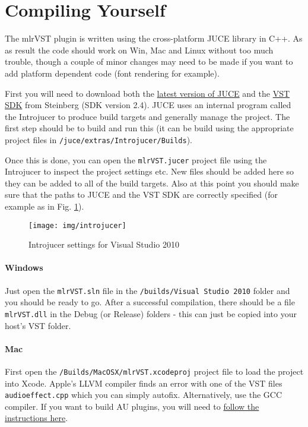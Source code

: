 \documentclass[10pt,a4paper]{report}
\begin{document}
\section{Compiling Yourself}

The mlrVST plugin is written using the cross-platform JUCE library in C++. As as result the code should work on Win, Mac and Linux without too much trouble, though a couple of minor changes may need to be made if you want to add platform dependent code (font rendering for example).

First you will need to download both the \href{https://github.com/julianstorer/JUCE}{latest version of JUCE} and the \href{http://www.steinberg.net/en/company/developer.html}{VST SDK} from Steinberg (SDK version 2.4). JUCE uses an internal program called the Introjucer to produce build targets and generally manage the project. The first step should be to build and run this (it can be build using the appropriate project files in \texttt{/juce/extras/Introjucer/Builds}).

Once this is done, you can open the \texttt{mlrVST.jucer} project file using the Introjucer to inspect the project settings etc. New files should be added here so they can be added to all of the build targets. Also at this point you should make sure that the paths to JUCE and the VST SDK are correctly specified (for example as in Fig. \ref{fig:jucer}).

\begin{figure}[h!]
	\centering
	\texttt{[image: img/introjucer]}
	\caption{Introjucer settings for Visual Studio 2010}
	\label{fig:jucer}
\end{figure}

\paragraph{Windows}

Just open the \texttt{mlrVST.sln} file in the \texttt{/builds/Visual Studio 2010} folder and you should be ready to go. After a successful compilation, there should be a file \texttt{mlrVST.dll} in the Debug (or Release) folders - this can just be copied into your host's VST folder.

\paragraph{Mac}

First open the \texttt{/Builds/MacOSX/mlrVST.xcodeproj} project file to load the project into Xcode. Apple's LLVM compiler finds an error with one of the VST files \texttt{audioeffect.cpp} which you can simply autofix. Alternatively, use the GCC compiler. If you want to build AU plugins, you will need to \href{http://www.rawmaterialsoftware.com/viewtopic.php?f=8&t=8682}{ follow the instructions here}.
\end{document}
